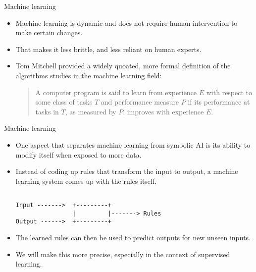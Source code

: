 \documentclass{beamer}
\begin{document}
\begin{frame}{Machine learning}

\begin{itemize}
\item Machine learning is dynamic and does not require human intervention to make certain changes. 

\item That makes it less brittle, and less reliant on human experts.

\item Tom Mitchell provided a widely quoated, more formal definition of the algorithms studies in the machine learning field:

\medskip
\begin{quote}
A computer program is said to learn from experience $E$ with respect to some class of tasks $T$ and performance measure $P$ if its performance at tasks in $T$, as measured by $P$, improves with experience $E$.
\end{quote}
\end{itemize}

\end{frame}

\begin{frame}[fragile]{Machine learning}
\begin{itemize}
\item One aspect that separates machine learning from symbolic AI is its ability to modify itself when exposed to more data.

\item Instead of coding up rules that transform the input to output, a machine learning system comes up with the rules itself.

\begin{verbatim}

Input ------->  +---------+
                |         |-------> Rules
Output ------>  +---------+

\end{verbatim}
\item The learned rules can then be used to predict outputs for new unseen inputs.

\item We will make this more precise, especially in the context of supervised learning.
\end{itemize}
\end{frame}
\end{document}
